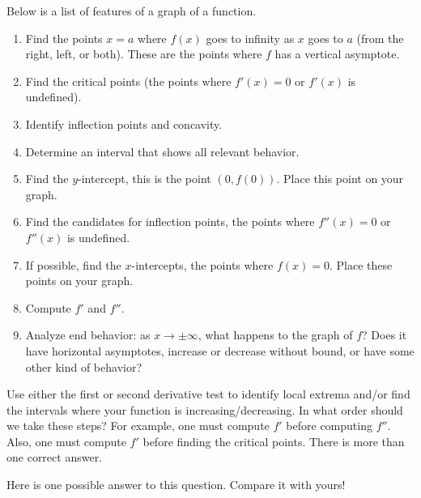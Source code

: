 \documentclass{ximera}
\begin{document}
\begin{problem}%
  Below is a list of features of a graph of a function.
  \begin{enumerate}
  \item Find the points $x=a$ where
    $f(x)$ goes to infinity as $x$ goes to $a$ (from the right, left,
    or both). These are the points where $f$ has a  vertical asymptote.
  \item Find the critical points (the points where $f'(x) = 0$ or
    $f'(x)$ is undefined).
 
  \item Identify inflection points and concavity.
  \item Determine an interval that shows all relevant behavior.
  \item Find the $y$-intercept, this is the point $(0,f(0))$. Place this
    point on your graph.
      \item Find the candidates for inflection points, the points where
    $f''(x) = 0$ or $f''(x)$ is undefined.
  \item If possible, find the $x$-intercepts, the points where $f(x) =
    0$. Place these points on your graph.
       \item Compute $f'$ and $f''$.
  \item Analyze end behavior:  as $x \to \pm \infty$, what happens to the graph of $f$?  Does it  have horizontal asymptotes, increase or decrease without bound, or have some other kind of behavior?
 \end{enumerate}
   \item Use either the first or second derivative test to identify local extrema and/or
    find the intervals where your function is increasing/decreasing.
  In what order should we take these steps? For example, one must compute
   $f'$ before computing $f''$. Also, one must compute $f'$ before 
   finding the critical points. There is more than one correct answer.
  \begin{freeResponse}
  Here is one possible answer to this question.  Compare it with yours!
\end{freeResponse}
\end{problem}
\end{document}
